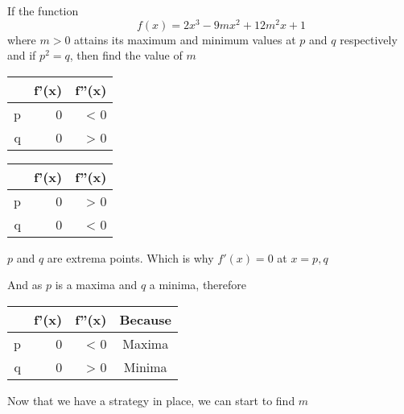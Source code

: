 \documentclass[14pt,fleqn]{extarticle}
\newcommand\fx{2x^3 - 9mx^2 + 12m^2 x + 1}
\begin{document}
\begin{question}
	\statement 
    
    If the function 
    \[ \qquad f(x) = \fx \]
    where $m > 0$ attains its maximum and minimum values at $p$ and $q$ respectively and if $p^2 = q$, then find the value of $m$ 
    
    \begin{step}
  \begin{options} 
     \correct 
       
       \begin{center}
  \begin{tabular}{NNN}
   \toprule
         &  f'(x) & f''(x) \\
   \midrule 
   p & 0 & < 0 \\
    \midrule 
    q & 0 & > 0 \\
    \bottomrule
  \end{tabular}
\end{center}
     \incorrect
        
               \begin{center}
  \begin{tabular}{NNN}
   \toprule
         &  f'(x) & f''(x) \\
   \midrule 
   p & 0 & > 0 \\
    \midrule 
    q & 0 & < 0 \\
    \bottomrule
  \end{tabular}
\end{center}
    \end{options} 
     \reason 
       
     $p$ and $q$ are extrema points. Which is why $f'(x) = 0$ at $x = p,q$ \newline 
     
     And as $p$ is a maxima and $q$ a minima, therefore 
            \begin{center}
  \begin{tabular}{NNNc}
   \toprule
         &  f'(x) & f''(x) & Because \\
   \midrule 
   p & 0 & < 0 & Maxima \\
    \midrule 
    q & 0 & > 0 & Minima \\
    \bottomrule
  \end{tabular}
\end{center}  

Now that we have a strategy in place, we can start to find $m$ 
\end{step}  


\end{question}
\end{document}
